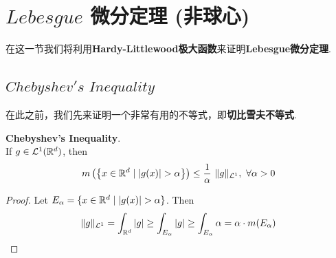 \newpage
\section{$Lebesgue$ 微分定理 (非球心)}
	\begin{center}
		在这一节我们将利用\textbf{Hardy-Littlewood极大函数}来证明\textbf{Lebesgue微分定理}.
	\end{center}
	
\subsection{$Chebyshev's \,\, Inequality$}
	在此之前，我们先来证明一个非常有用的不等式，即\textbf{切比雪夫不等式}.
	\begin{thm}\label{thm 4.2.1}
		\textbf{Chebyshev's Inequality}. \\
		If $g \in \mathcal{L}^{1}(\mathbb{R}^d)$, then
		\begin{align}
			m\left( \left\{ x \in \mathbb{R}^d \mid \left| g(x) \right| > \alpha \right\} \right)
			\leq \frac{1}{\alpha} \,\, \Vert g \Vert_{\mathcal{L}^1} , \,\, \forall \alpha > 0
		\end{align}
		
		\vspace{4em}
		\begin{proof}
			Let $E_\alpha = \{ x \in \mathbb{R}^d \mid \left| g(x) \right| > \alpha \}$. Then
			\begin{align}
				\Vert g \Vert_{\mathcal{L}^1}
				= \int_{\mathbb{R}^d}{\left| g \right|}
				\geq \int_{E_\alpha}{\left| g \right|}
				\geq \int_{E_\alpha}{\alpha}
				= \alpha \cdot m(E_\alpha)
			\end{align}
		\end{proof}
	\end{thm}

\newpage
